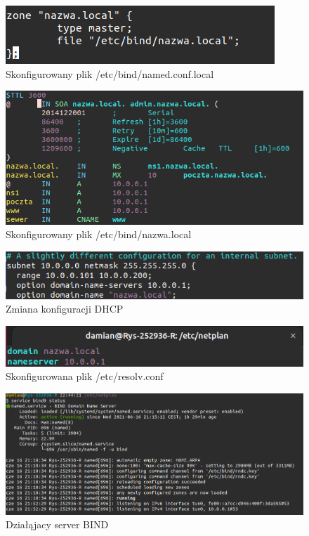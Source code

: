 \documentclass{article}
\begin{document}
\begin{figure}[H]
    \centering
    \includegraphics[scale = 0.8]{DNS/heUah3h.png}  
    \caption{Skonfigurowany plik /etc/bind/named.conf.local}
    \label{2}
\end{figure}

\begin{figure}[H]
    \centering
    \includegraphics[scale = 0.45]{DNS/UmpPeuu.png}  
    \caption{Skonfigurowany plik /etc/bind/nazwa.local}
    \label{2}
\end{figure}



\begin{figure}[H]
    \centering
    \includegraphics[scale = 0.5]{DNS/nXDSlle.png}  
    \caption{Zmiana konfiguracji DHCP}
    \label{2}
\end{figure}

\begin{figure}[H]
    \centering
    \includegraphics[scale = 0.6]{DNS/hzcTdrj.png}  
    \caption{Skonfigurowana plik /etc/resolv.conf}
    \label{2}
\end{figure}

\begin{figure}[H]
    \centering
    \includegraphics[scale = 0.35]{DNS/SFBDYnG.png}  
    \caption{Działąjacy server BIND }
    \label{2}
\end{figure}
\end{document}
